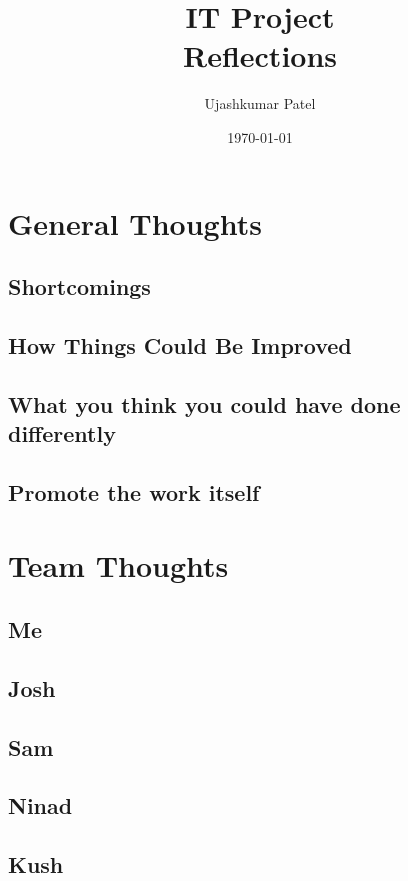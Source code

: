 \documentclass[a4paper, 12pt, twoside]{article}
\title{IT Project \\ Reflections}
\author{Ujashkumar Patel}
\date{\today}
\begin{document}
\pagestyle{plain}

\section{General Thoughts}
 \subsection{Shortcomings}
 \subsection{How Things Could Be Improved}
 \subsection{What you think you could have done differently}
 \subsection{Promote the work itself}

\section{Team Thoughts}
\subsection{Me}
\subsection{Josh}
\subsection{Sam}
\subsection{Ninad}
\subsection{Kush}
\end{document}
